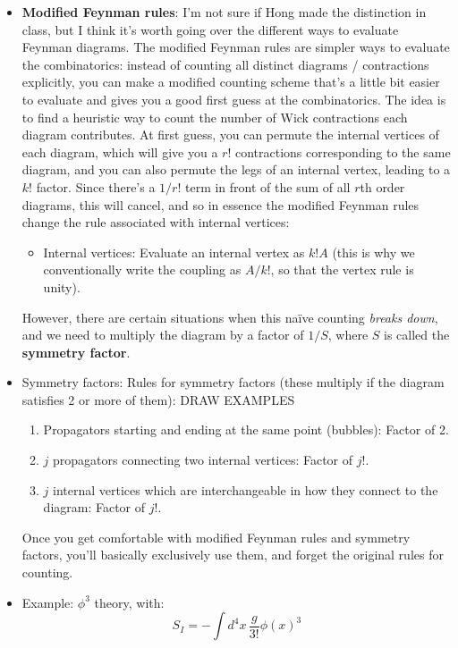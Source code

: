 \documentclass[12pt, oneside]{article}   	%
\theoremstyle{definition}
\begin{document}
\begin{itemize}
	\item \textbf{Modified Feynman rules}: I'm not sure if Hong made the distinction in class, but I think it's worth going over the different ways to evaluate Feynman diagrams. The modified Feynman rules are simpler ways to evaluate the combinatorics: instead of counting all distinct diagrams / contractions explicitly, you can make a modified counting scheme that's a little bit easier to evaluate and gives you a good first guess at the combinatorics. The idea is to find a heuristic way to count the number of Wick contractions each diagram contributes. At first guess, you can permute the internal vertices of each diagram, which will give you a $r!$ contractions corresponding to the same diagram, and you can also permute the legs of an internal vertex, leading to a $k!$ factor. Since there's a $1 / r!$ term in front of the sum of all $r$th order diagrams, this will cancel, and so in essence the modified Feynman rules change the rule associated with internal vertices:
	\begin{itemize}
		\item Internal vertices: Evaluate an internal vertex as $k! A$ (this is why we conventionally write the coupling as $A / k!$, so that the vertex rule is unity). 
	\end{itemize}
	However, there are certain situations when this na\"ive counting \textit{breaks down}, and we need to multiply the diagram by a factor of $1 / S$, where $S$ is called the \textbf{symmetry factor}. 
	
	\item Symmetry factors: Rules for symmetry factors (these multiply if the diagram satisfies 2 or more of them): {\color{red} DRAW EXAMPLES}
	\begin{enumerate}
		\item Propagators starting and ending at the same point (bubbles): Factor of 2. 
		\item $j$ propagators connecting two internal vertices: Factor of $j!$. 
		\item $j$ internal vertices which are interchangeable in how they connect to the diagram: Factor of $j!$. 
	\end{enumerate}
	Once you get comfortable with modified Feynman rules and symmetry factors, you'll basically exclusively use them, and forget the original rules for counting. 
	
	\item Example: $\phi^3$ theory, with:
	\begin{equation}
		S_I = -\int d^4 x\, \frac{g}{3!} \phi(x)^3
	\end{equation}

\end{itemize}
\end{document}
